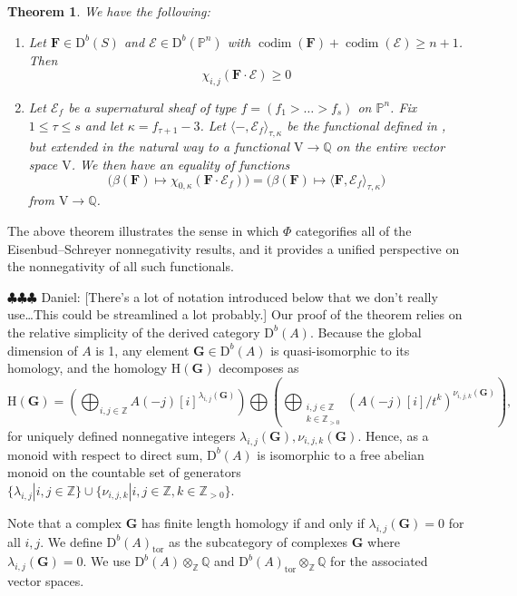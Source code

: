 \documentclass[12pt]{amsart}
\newtheorem{thm}[lemma]{Theorem}
\theoremstyle{definition}
\theoremstyle{remark}
\newcommand{\codim}{\operatorname{codim}}
\newcommand{\PP}{\mathbb{P}}
\newcommand{\HH}{\mathrm{H}}
\newcommand{\ZZ}{\mathbb{Z}}
\newcommand{\QQ}{\mathbb{Q}}
\newcommand{\VV}{\mathrm{V}}
\newcommand{\cE}{\mathcal{E}}
\newcommand{\FF}{\mathbf{F}}
\newcommand{\Gbull}{\mathbf{G}}
\newcommand{\DD}{\mathrm{D}}
\newcommand{\daniel}[1]{{\color{green} \sf $\clubsuit\clubsuit\clubsuit$ Daniel: [#1]}}
\begin{document}
\begin{thm}\label{thm:categorified}
We have the following:
\begin{enumerate}
	\item  Let $\FF\in \DD^b(S)$ and $\cE\in \DD^b(\PP^n)$ with $\codim(\FF)+\codim(\cE)\geq n+1$.  Then
\[
\chi_{i,j}(\FF\cdot \cE)\geq 0
\]
	\item  Let $\cE_{f}$ be a supernatural sheaf of type $f=(f_1>\dots>f_s)$ on $\PP^n$.  Fix $1\leq \tau \leq s$ and let $\kappa=f_{\tau+1}-3$.  Let $\langle -, \cE_{f}\rangle_{\tau,\kappa}$ be the functional defined in \cite{eis-schrey-icm}, but extended in the natural way to a functional $\VV\to \QQ$ on the entire vector space $\VV$.  We then have an equality of functions
\[
\bigg( \beta(\FF)\mapsto \chi_{0,\kappa}(\FF\cdot \cE_f)\bigg) =\bigg( \beta(\FF)\mapsto \langle \FF, \cE_f\rangle_{\tau,\kappa} \bigg)\]
from $\VV \to \QQ$.
\end{enumerate}
\end{thm}
The above theorem illustrates the sense in which $\Phi$ categorifies all of the Eisenbud--Schreyer nonnegativity results, and it provides a unified perspective on the nonnegativity of all such functionals.  


\daniel{There's a lot of notation introduced below that we don't really use\dots This could be streamlined a lot probably.}
Our proof of the theorem relies on the relative simplicity of the derived category $\DD^b(A)$.  Because the global dimension of $A$ is 1, any element $\Gbull\in \DD^b(A)$ is quasi-isomorphic to its homology, and the homology $\HH(\Gbull)$ decomposes as
\begin{equation}\label{eqn:splitting}
\HH(\Gbull)=\left( \bigoplus_{i,j\in \ZZ} A(-j)[i]^{\lambda_{i,j}(\Gbull)}\right) \bigoplus \left( \bigoplus_{\substack{i,j\in \ZZ\\ k\in \ZZ_{>0}}} (A(-j)[i]/t^k)^{\nu_{i,j,k}(\Gbull)}\right),
\end{equation}
for uniquely defined nonnegative integers $\lambda_{i,j}(\Gbull), \nu_{i,j,k}(\Gbull)$.  Hence, as a monoid with respect to direct sum, $\DD^b(A)$ is isomorphic to a free abelian monoid on the countable set of generators $\{\lambda_{i,j} | i,j\in \ZZ\} \cup \{ \nu_{i,j,k}  | i,j\in \ZZ, k\in \ZZ_{>0}\}$. 

Note that a complex $\Gbull$ has finite length homology if and only if $\lambda_{i,j}(\Gbull)=0$ for all $i,j$.  We  define $\DD^b(A)_{\text{tor}}$ as the subcategory of complexes $\Gbull$ where $\lambda_{i,j}(\Gbull)=0$.  We use $\DD^b(A)\otimes_{\ZZ} \QQ$ and $\DD^b(A)_{\text{tor}}\otimes_{\ZZ} \QQ$ for the associated vector spaces.
\end{document}

